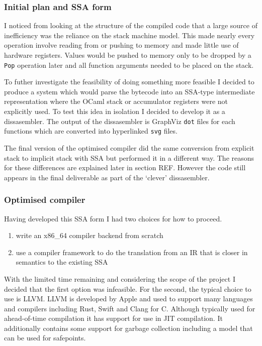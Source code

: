 \subsubsection{Initial plan and SSA form}

I noticed from looking at the structure of the compiled code that a large source of inefficiency
was the reliance on the stack machine model. This made nearly every operation involve reading from
or pushing to memory and made little use of hardware registers. Values would be pushed to memory
only to be dropped by a \texttt{Pop} operation later and all function arguments needed to be placed
on the stack.

To futher investigate the feasibility of doing something more feasible I decided to produce a
system which would parse the bytecode into an SSA-type intermediate representation where the OCaml
stack or accumulator registers were not explicitly used. To test this idea in isolation I decided
to develop it as a dissasembler. The output of the dissasembler is GraphViz \texttt{dot} files for
each functions which are converted into hyperlinked \texttt{svg} files.

The final version of the optimised compiler did the same conversion from explicit stack to implicit
stack with SSA but performed it in a different way. The reasons for these differences are explained
later in section REF. However the code still appears in the final deliverable as part of the
`clever' dissasembler.

\subsubsection{Optimised compiler}

Having developed this SSA form I had two choices for how to proceed.

\begin{enumerate}
      \item write an x86\_64 compiler backend from scratch
      \item use a compiler framework to do the translation from an IR that is closer in semantics
            to
            the existing SSA
\end{enumerate}

With the limited time remaining and considering the scope of the project I decided that the first
option was infeasible. For the second, the typical choice to use is LLVM. LLVM is developed by
Apple and used to support many languages and compilers including Rust, Swift and Clang for C.
Although typically used for ahead-of-time compilation it has support for use in JIT compilation. It
additionally contains some support for garbage collection including a model that can be used for
safepoints.

